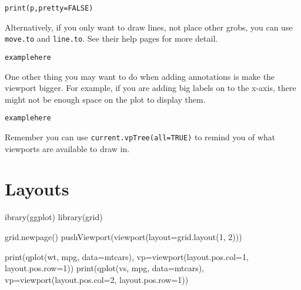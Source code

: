 \begin{alltt}
print(p, pretty=FALSE)
\end{alltt}

Alternatively, if you only want to draw lines, not place other grobs, you can use {\tt move.to} and {\tt line.to}.  See their help pages for more detail.

\begin{alltt}
example here
\end{alltt}

One other thing you may want to do when adding annotations is make the viewport bigger.  For example, if you are adding big labels on to the x-axis, there might not be enough space on the plot to display them.  

\begin{alltt}
example here
\end{alltt}

Remember you can use {\tt current.vpTree(all=TRUE)} to remind you of what viewports are available to draw in.

\section{Layouts}\label{sec:layouts} %

ibrary(ggplot)
library(grid)

grid.newpage()
pushViewport(viewport(layout=grid.layout(1, 2)))

print(qplot(wt, mpg, data=mtcars), vp=viewport(layout.pos.col=1, layout.pos.row=1))
print(qplot(vs, mpg, data=mtcars), vp=viewport(layout.pos.col=2, layout.pos.row=1))





